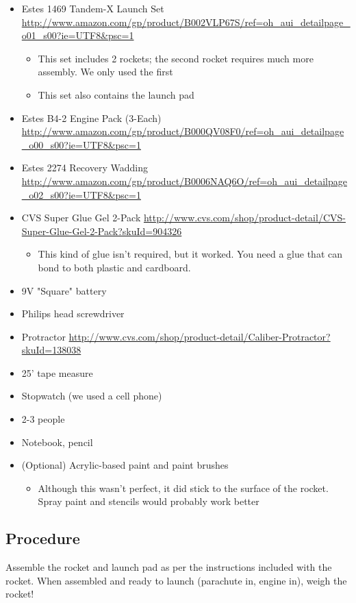 \documentclass{article}
\begin{document}
\begin{itemize}
 \item Estes 1469 Tandem-X Launch Set \url{http://www.amazon.com/gp/product/B002VLP67S/ref=oh_aui_detailpage_o01_s00?ie=UTF8&psc=1}
 \begin{itemize}
	 \item This set includes 2 rockets; the second rocket requires much more assembly. We only used the first
	 \item This set also contains the launch pad
 \end{itemize}
 \item Estes B4-2 Engine Pack (3-Each) \url{http://www.amazon.com/gp/product/B000QV08F0/ref=oh_aui_detailpage_o00_s00?ie=UTF8&psc=1}
 \item Estes 2274 Recovery Wadding \url{http://www.amazon.com/gp/product/B0006NAQ6O/ref=oh_aui_detailpage_o02_s00?ie=UTF8&psc=1}
 \item CVS Super Glue Gel 2-Pack \url{http://www.cvs.com/shop/product-detail/CVS-Super-Glue-Gel-2-Pack?skuId=904326}
 \begin{itemize}
	 \item This kind of glue isn't required, but it worked. You need a glue that can bond to both plastic and cardboard.
 \end{itemize}
 \item 9V "Square" battery
 \item Philips head screwdriver
 \item Protractor \url{http://www.cvs.com/shop/product-detail/Caliber-Protractor?skuId=138038}
 \item 25' tape measure
 \item Stopwatch (we used a cell phone)
 \item 2-3 people
 \item Notebook, pencil
 \item (Optional) Acrylic-based paint and paint brushes
 \begin{itemize}
	 \item Although this wasn't perfect, it did stick to the surface of the rocket. Spray paint and stencils would probably work better
 \end{itemize}
\end{itemize}

\subsection{Procedure}

Assemble the rocket and launch pad as per the instructions included with the rocket.
When assembled and ready to launch (parachute in, engine in), weigh the rocket!
\end{document}
